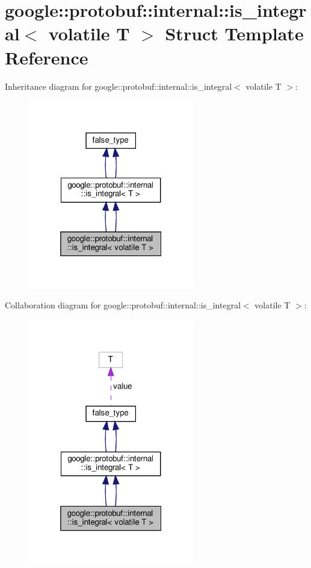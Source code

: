 \hypertarget{structgoogle_1_1protobuf_1_1internal_1_1is__integral_3_01volatile_01T_01_4}{}\section{google\+:\+:protobuf\+:\+:internal\+:\+:is\+\_\+integral$<$ volatile T $>$ Struct Template Reference}
\label{structgoogle_1_1protobuf_1_1internal_1_1is__integral_3_01volatile_01T_01_4}


Inheritance diagram for google\+:\+:protobuf\+:\+:internal\+:\+:is\+\_\+integral$<$ volatile T $>$\+:
\nopagebreak
\begin{figure}[H]
\begin{center}
\leavevmode
\includegraphics[width=205pt]{structgoogle_1_1protobuf_1_1internal_1_1is__integral_3_01volatile_01T_01_4__inherit__graph}
\end{center}
\end{figure}


Collaboration diagram for google\+:\+:protobuf\+:\+:internal\+:\+:is\+\_\+integral$<$ volatile T $>$\+:
\nopagebreak
\begin{figure}[H]
\begin{center}
\leavevmode
\includegraphics[width=205pt]{structgoogle_1_1protobuf_1_1internal_1_1is__integral_3_01volatile_01T_01_4__coll__graph}
\end{center}
\end{figure}

